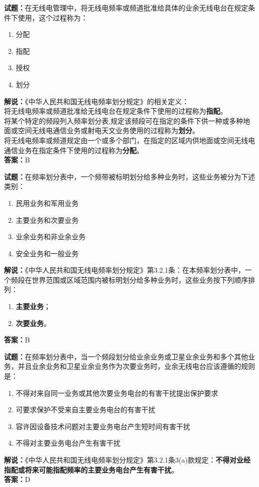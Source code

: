 \documentclass{ctexbook}
\begin{document}
\noindent\textbf{试题：}在无线电管理中，将无线电频率或频道批准给具体的业余无线电台在规定条件下使用，这个过程称为：
\begin{enumerate}[leftmargin=3em]
  \item 分配
  \item 指配
  \item 授权
  \item 划分
\end{enumerate}
\noindent\textbf{解说：}《中华人民共和国无线电频率划分规定》的相关定义：\\将无线电频率或频道批准给无线电台在规定条件下使用的过程称为\textbf{指配}。\\将某个特定的频段列入频率划分表,规定该频段可在指定的条件下供一种或多种地面或空间无线电通信业务或射电天文业务使用的过程称为\textbf{划分}。\\将无线电频率或频道规定由一个或多个部门，在指定的区域内供地面或空间无线电通信业务在指定条件下使用的过程称为\textbf{分配}。\\
\textbf{答案：}B

\bigskip

\noindent\textbf{试题：}在频率划分表中，一个频带被标明划分给多种业务时，这些业务被分为下述类别：
\begin{enumerate}[leftmargin=3em]
  \item 民用业务和军用业务
  \item 主要业务和次要业务
  \item 业余业务和非业余业务
  \item 安全业务和一般业务
\end{enumerate}
\noindent\textbf{解说：}《中华人民共和国无线电频率划分规定》第3.2.1条：在本频率划分表中，一个频段在世界范围或区域范围内被标明划分给多种业务时，这些业务按下列顺序排列：
\begin{enumerate}[leftmargin=3em, label=\alph*)]
  \item \textbf{主要业务}；
  \item \textbf{次要业务}。
\end{enumerate}
\textbf{答案：}B

\bigskip

\noindent\textbf{试题：}在频率划分表中，当一个频段划分给业余业务或卫星业余业务和多个其他业务，并且业余业务和卫星业余业务作为次要业务时，业余无线电台应该遵循的规则是：
\begin{enumerate}[leftmargin=3em]
  \item 不得对来自同一业务或其他次要业务电台的有害干扰提出保护要求
  \item 可要求保护不受来自主要业务电台的有害干扰
  \item 容许因设备技术问题对主要业务电台产生短时间有害干扰
  \item 不得对主要业务电台产生有害干扰
\end{enumerate}
\noindent\textbf{解说：}《中华人民共和国无线电频率划分规定》第3.2.1条3(a)款规定：\textbf{不得对业经指配或将来可能指配频率的主要业务电台产生有害干扰}。\\
\textbf{答案：}D
\end{document}
